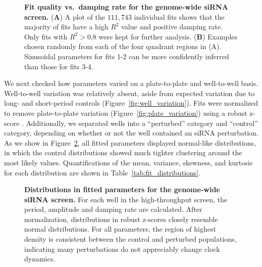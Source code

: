 \documentclass[11pt, letterpaper]{article}
\begin{document}
\begin{figure}[tbp]
  \begin{center}
  \end{center}
  \caption{{\bfseries Fit quality vs.\ damping rate for the genome-wide siRNA screen.}
({\bfseries A}) A plot of the $111,743$ individual fits shows that the majority of fits have a high $R^2$ value and positive damping rate. Only fits with $R^2 > 0.8$ were kept for further analysis.
({\bfseries B}) Examples chosen randomly from each of the four quadrant regions in (A). Sinusoidal parameters for fits 1-2 can be more confidently inferred than those for fits 3-4.}
\label{fig:fit_quality}
\end{figure}

We next checked how parameters varied on a plate-to-plate and well-to-well basis.
Well-to-well variation was relatively absent, aside from expected variation due to long- and short-period controls (Figure~\ref{fig:well_variation}).
Fits were normalized to remove plate-to-plate variation (Figure~\ref{fig:plate_variation}) using a robust z-score \cite{Birmingham2009}.
Additionally, we separated wells into a ``perturbed'' category and ``control'' category, depending on whether or not the well contained an siRNA perturbation.
As we show in Figure~\ref{fig:fit_distributions}, all fitted parameters displayed normal-like distributions, in which the control distributions showed much tighter clustering around the most likely values.
Quantifications of the mean, variance, skewness, and kurtosis for each distribution are shown in Table~\ref{tab:fit_distributions}.

\begin{figure}[tbp]
  \begin{center}
  \end{center}
  \caption{{\bfseries Distributions in fitted parameters for the genome-wide siRNA screen.} For each well in the high-throughput screen, the period, amplitude and damping rate are calculated. After normalization, distributions in robust z-scores closely resemble normal distributions. For all parameters, the region of highest density is consistent between the control and perturbed populations, indicating many perturbations do not appreciably change clock dynamics.} 
\label{fig:fit_distributions}
\end{figure}
\end{document}
